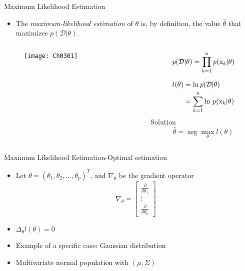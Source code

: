 \begin{frame}{{Maximum Likelihood Estimation}}
\begin{itemize}
\item The \textit{\color{mycolor1}maximum-likelihood estimation} of $\theta$ is, by definition, the value $\hat{\theta}$ that maximizes $p(\mathcal{D}|\theta)$.
\end{itemize}
\vspace{-12pt}
\begin{columns}
\begin{column}{6cm}
\vspace{-12pt}
\begin{figure}
\texttt{[image: Ch0301]}
\end{figure}
\end{column}
\begin{column}{5cm}
\begin{equation}
p(\mathcal{D}| \theta ) = \prod\limits_{k = 1}^n {p({{\rm x}_k}|\theta )}\nonumber
\end{equation}

\begin{align}
l(\theta)&=\ln p(\mathcal{D}|\theta)\nonumber\\
&=\sum\limits_{k = 1}^n {{\mathop{\rm \ln } \nolimits}~p({{\rm x}_k}|\theta )}\nonumber
\end{align}
{\color{mycolor2}Solution}\\
\begin{equation}
\hat \theta  = \arg \mathop {\max }\limits_\theta  l(\theta )\nonumber
\end{equation}
\end{column}
\end{columns}
\end{frame}

\begin{frame}{Maximum Likelihood Estimation-Optimal estimation}
\begin{itemize}
\item Let $\theta=(\theta_1,\theta_2,\ldots,\theta_p)^T$, and $\nabla_{\theta}$ be the gradient operator
\begin{equation}
{\nabla _\theta } = \left[ {\begin{array}{*{20}{c}}
{\frac{\partial }{{\partial {\theta _1}}}}\\
 \vdots \\
{\frac{\partial }{{\partial {\theta _p}}}}
\end{array}} \right]\nonumber
\end{equation}
\item $\Delta_{\theta}l(\theta)=0$
\item {\color{mycolor1}Example of a specific case}: Gaussian distribution
\item Multivariate normal population with $(\mu,\Sigma)$
\end{itemize}
\end{frame}

